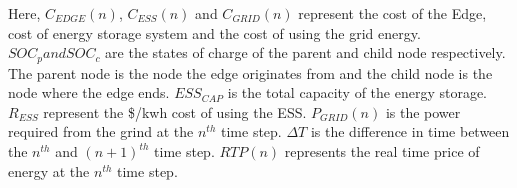 Here, $C_{EDGE}(n)$, $C_{ESS}(n)$ and $C_{GRID}(n)$ represent the cost of the Edge, cost of energy storage system and the cost of using the grid energy. $SOC_p and SOC_c$ are the states of charge of the parent and child node respectively. The parent node is the node the edge originates from and the child node is the node where the edge ends. $ESS_{CAP}$ is the total capacity of the energy storage. $R_{ESS}$ represent the \$/kwh cost of using the ESS. $P_{GRID}(n)$ is the power required from the grind at the $n^{th}$ time step. $\Delta T$ is the difference in time between the $n^{th}$ and $(n+1)^{th}$ time step. $RTP(n)$ represents the real time price of energy at the $n^{th}$ time step. 